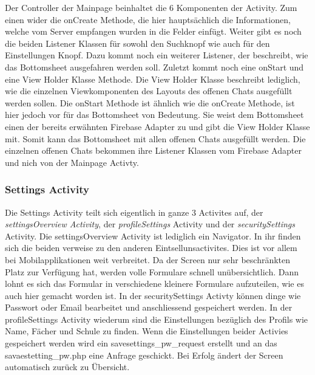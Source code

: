 \documentclass[a4paper,11pt]{report}
\begin{document}
				Der Controller der Mainpage beinhaltet die 6 Komponenten der Activity. Zum einen wider die onCreate Methode, die hier hauptsächlich die Informationen, welche vom Server empfangen wurden in die Felder einfügt. Weiter gibt es noch die beiden Listener Klassen für sowohl den Suchknopf wie auch für den Einstellungen Knopf. Dazu kommt noch ein weiterer Listener, der beschreibt, wie das Bottomsheet ausgefahren werden soll. Zuletzt kommt noch eine onStart und eine View Holder Klasse Methode. Die View Holder Klasse beschreibt lediglich, wie die einzelnen Viewkomponenten des Layouts des offenen Chats ausgefüllt werden sollen. Die onStart Methode ist ähnlich wie die onCreate Methode, ist hier jedoch vor für das Bottomsheet von Bedeutung. Sie weist dem Bottomsheet einen der bereits erwähnten Firebase Adapter zu und gibt die View Holder Klasse mit. Somit kann das Bottomsheet mit allen offenen Chats ausgefüllt werden. Die einzelnen offenen Chats bekommen ihre Listener Klassen vom Firebase Adapter und nich von der Mainpage Activty.
				\subsubsection{Settings Activity} \label{settings:act}
				Die Settings Activity teilt sich eigentlich in ganze 3 Activites auf, der \emph{settingsOverview Activity}, der \emph{profileSettings} Activity und der \emph{securitySettings} Activity. Die settingsOverview Activity ist lediglich ein Navigator. In ihr finden sich die beiden verweise zu den anderen Eintsellunsactivites. Dies ist vor allem bei Mobilapplikationen weit verbreitet. Da der Screen nur sehr beschränkten Platz zur Verfügung hat, werden volle Formulare schnell unübersichtlich. Dann lohnt es sich das Formular in verschiedene kleinere Formulare aufzuteilen, wie es auch hier gemacht worden ist. In der securitySettings Activty können dinge wie Passwort oder Email bearbeitet und anschliessend gespeichert werden. In der profileSettings Activity wiederum sind die Einstellungen bezüglich des Profils wie Name, Fächer und Schule zu finden. Wenn die Einstellungen beider Activies gespeichert werden wird ein savesettings\_pw\_request erstellt und an das savaestetting\_pw.php eine Anfrage geschickt. Bei Erfolg ändert der Screen automatisch zurück zu Übersicht.
\end{document}

